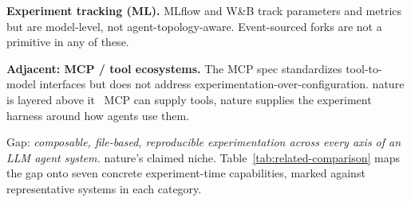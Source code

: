 \documentclass[11pt,a4paper]{article}
\begin{document}
\textbf{Experiment tracking (ML).} MLflow and W\&B track
parameters and metrics but are model-level, not
agent-topology-aware. Event-sourced forks are not a primitive
in any of these.

\textbf{Adjacent: MCP / tool ecosystems.} The MCP spec
standardizes tool-to-model interfaces but does not address
experimentation-over-configuration. nature is layered above it
\textemdash\ MCP can supply tools, nature supplies the experiment
harness around how agents use them.

Gap: \emph{composable, file-based, reproducible experimentation
across every axis of an LLM agent system.} nature's claimed
niche. Table~\ref{tab:related-comparison} maps the gap onto
seven concrete experiment-time capabilities, marked against
representative systems in each category.
\end{document}
